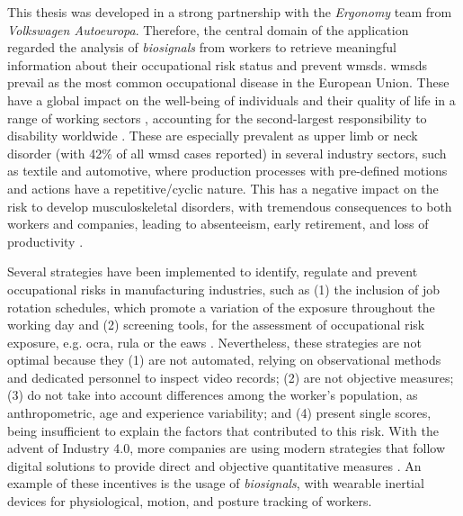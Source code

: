 This thesis was developed in a strong partnership with the \textit{Ergonomy} team from \textit{Volkswagen Autoeuropa}. Therefore, the central domain of the application regarded the analysis of \textit{biosignals} from workers to retrieve meaningful information about their occupational risk status and prevent \gls{wmsd}s. \gls{wmsd}s prevail as the most common occupational disease in the European Union. These have a global impact on the well-being of individuals and their quality of life in a range of working sectors \cite{Irastorza2010}, accounting for the second-largest responsibility to disability worldwide \cite{Luttmann2003}. These are especially prevalent as upper limb or neck disorder (with 42\% of all \gls{wmsd} cases reported) \cite{Seidel2019} in several industry sectors, such as textile and automotive, where production processes with pre-defined motions and actions have a repetitive/cyclic nature. This has a negative impact on the risk to develop musculoskeletal disorders, with tremendous consequences to both workers and companies, leading to absenteeism, early retirement, and loss of productivity \cite{Trabalhadores, Varandas19}. 

Several strategies have been implemented to identify, regulate and prevent occupational risks in manufacturing industries, such as (1) the inclusion of job rotation schedules, which promote a variation of the exposure throughout the working day \cite{jobrotation1, jobrotation2} and (2) screening tools, for the assessment of occupational risk exposure, e.g. \gls{ocra}, \gls{rula} or the \gls{eaws} \cite{ocra, rula, eaws}. Nevertheless, these strategies are not optimal because they (1) are not automated, relying on observational methods and dedicated personnel to inspect video records; (2) are not objective measures; (3) do not take into account differences among the worker's population, as anthropometric, age and experience variability; and (4) present single scores, being insufficient to explain the factors that contributed to this risk. With the advent of Industry 4.0, more companies are using modern strategies that follow digital solutions to provide direct and objective quantitative measures \cite{romero}. An example of these incentives is the usage of \textit{biosignals}, with wearable inertial devices for physiological, motion, and posture tracking of workers.

